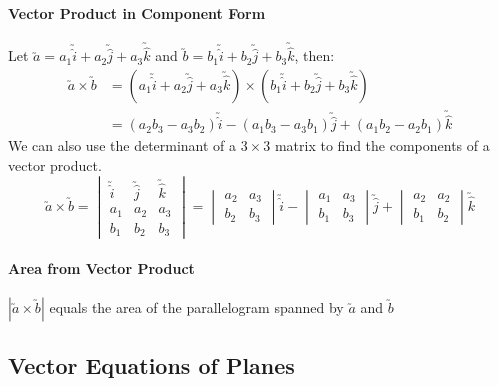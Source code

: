 \documentclass[a4paper,twoside]{article}
\begin{document}
			\paragraph{Vector Product in Component Form}
				Let $\utilde{a}=a_1\utilde{\hat{i}}+a_2\utilde{\hat{j}}+a_3\utilde{\hat{k}}$ and $\utilde{b}=b_1\utilde{\hat{i}}+b_2\utilde{\hat{j}}+b_3\utilde{\hat{k}}$, then:
				\begin{align*}
					\utilde{a}\times\utilde{b}&=\left(a_1\utilde{\hat{i}}+a_2\utilde{\hat{j}}+a_3\utilde{\hat{k}}\right)\times\left(b_1\utilde{\hat{i}}+b_2\utilde{\hat{j}}+b_3\utilde{\hat{k}}\right)\\
					&=(a_2b_3-a_3b_2)\utilde{\hat{i}}-(a_1b_3-a_3b_1)\utilde{\hat{j}}+(a_1b_2-a_2b_1)\utilde{\hat{k}}
				\end{align*}
				We can also use the determinant of a $3\times3$ matrix to find the components of a vector product.
				\begin{equation*}
					\utilde{a}\times\utilde{b}=\begin{vmatrix}
						\utilde{\hat{i}} & \utilde{\hat{j}} & \utilde{\hat{k}} \\
						a_1 & a_2 & a_3 \\
						b_1 & b_2 & b_3
					\end{vmatrix}=\begin{vmatrix}
						a_2 & a_3 \\
						b_2 & b_3
					\end{vmatrix}\utilde{\hat{i}} - \begin{vmatrix}
						a_1 & a_3 \\
						b_1 & b_3
					\end{vmatrix}\utilde{\hat{j}} + \begin{vmatrix}
						a_2 & a_2 \\
						b_1 & b_2
					\end{vmatrix}\utilde{\hat{k}}
				\end{equation*}
			
			\paragraph{Area from Vector Product} $|\utilde{a}\times\utilde{b}|$ equals the area of the parallelogram spanned by $\utilde{a}$ and $\utilde{b}$
		\subsection{Vector Equations of Planes}
\end{document}
